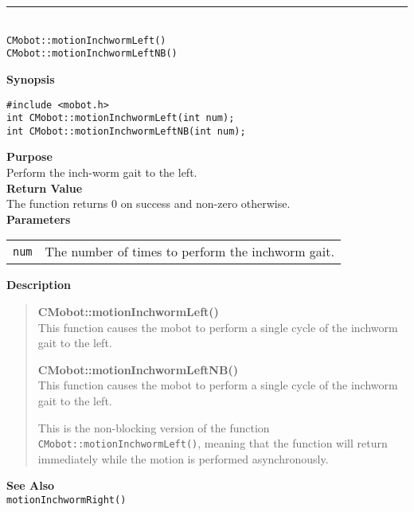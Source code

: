\noindent
\vspace{5pt}
\rule{4.5in}{0.015in}\\
\noindent
{\LARGE \texttt{CMobot::motionInchwormLeft()}}\\
{\LARGE \texttt{CMobot::motionInchwormLeftNB()}}\\
{}

\noindent
{\bf Synopsis}
\vspace{-8pt}
\begin{verbatim}
#include <mobot.h>
int CMobot::motionInchwormLeft(int num);
int CMobot::motionInchwormLeftNB(int num);
\end{verbatim}

\noindent
{\bf Purpose}\\
Perform the inch-worm gait to the left.\\

\noindent
{\bf Return Value}\\
The function returns 0 on success and non-zero otherwise.\\

\noindent
{\bf Parameters}\\
\vspace{-0.1in}
\begin{description}
\item               
\begin{tabular}{p{15 mm}p{145 mm}}
\texttt{num} & The number of times to perform the inchworm gait.\\
\end{tabular}
\end{description}

\noindent
{\bf Description}\\
\vspace{-12pt}
\begin{quote}
{\bf CMobot::motionInchwormLeft()}\\
This function causes the mobot to perform a single cycle of the inchworm gait
to the left. 

{\bf CMobot::motionInchwormLeftNB()}\\
This function causes the mobot to perform a single cycle of the inchworm gait
to the left. 

This is the non-blocking version of the function \texttt{CMobot::motionInchwormLeft()},
meaning that the function will return immediately while the motion is performed
asynchronously.
\end{quote}
\noindent
{\bf See Also}\\
\texttt{motionInchwormRight()}

